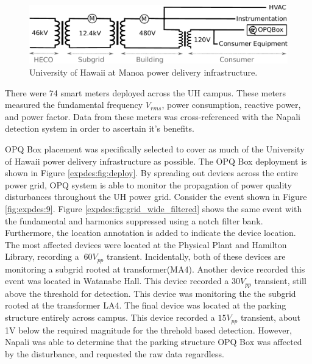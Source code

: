\begin{figure}[h]
    \centering
    \includegraphics[width=1\linewidth]{img/uh-grid.pdf}
    \caption{University of Hawaii at Manoa power delivery infrastructure.}
    \label{expdes:fig:1}
\end{figure}

There were 74 smart meters deployed across the UH campus.
These meters measured the fundamental frequency $V_{rms}$, power consumption, reactive power, and power factor.
Data from these meters was cross-referenced with the Napali detection system in order to ascertain it's benefits.

OPQ Box placement was specifically selected to cover as much of the University of Hawaii power delivery infrastructure as possible.
The OPQ Box deployment is shown in Figure \ref{expdes:fig:deploy}.
By spreading out devices across the entire power grid, OPQ system is able to monitor the propagation of power quality disturbances throughout the UH power grid.
Consider the event shown in Figure \ref{fig:expdes:9}.
Figure \ref{expdes:fig:grid_wide_filtered} shows the same event with the fundamental and harmonics suppressed using a notch filter bank.
Furthermore, the location annotation is added to indicate the device location.
The most affected devices were located at the Physical Plant and Hamilton Library, recording a $~60V_{pp}$ transient.
Incidentally, both of these devices are monitoring a subgrid rooted at transformer(MA4).
Another device recorded this event was located in Watanabe Hall.
This device recorded a $30V_{pp}$ transient, still above the threshold for detection.
This device was monitoring the the subgrid rooted at the transformer LA4.
The final device was located at the parking structure entirely across campus.
This device recorded a $15V_{pp}$ transient, about 1V below the required magnitude for the threhold based detection.
However, Napali was able to determine that the parking structure OPQ Box was affected by the disturbance, and requested the raw data regardless.

